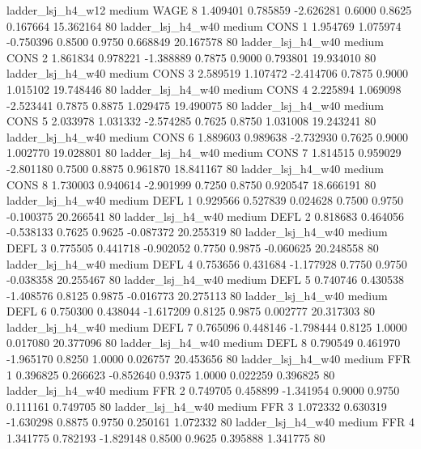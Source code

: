      ladder_lsj_h4_w12     medium     WAGE                 8  1.409401 0.785859 -2.626281 0.6000 0.8625  0.167664   15.362164 80
     ladder_lsj_h4_w40     medium     CONS                 1  1.954769 1.075974 -0.750396 0.8500 0.9750  0.668849   20.167578 80
     ladder_lsj_h4_w40     medium     CONS                 2  1.861834 0.978221 -1.388889 0.7875 0.9000  0.793801   19.934010 80
     ladder_lsj_h4_w40     medium     CONS                 3  2.589519 1.107472 -2.414706 0.7875 0.9000  1.015102   19.748446 80
     ladder_lsj_h4_w40     medium     CONS                 4  2.225894 1.069098 -2.523441 0.7875 0.8875  1.029475   19.490075 80
     ladder_lsj_h4_w40     medium     CONS                 5  2.033978 1.031332 -2.574285 0.7625 0.8750  1.031008   19.243241 80
     ladder_lsj_h4_w40     medium     CONS                 6  1.889603 0.989638 -2.732930 0.7625 0.9000  1.002770   19.028801 80
     ladder_lsj_h4_w40     medium     CONS                 7  1.814515 0.959029 -2.801180 0.7500 0.8875  0.961870   18.841167 80
     ladder_lsj_h4_w40     medium     CONS                 8  1.730003 0.940614 -2.901999 0.7250 0.8750  0.920547   18.666191 80
     ladder_lsj_h4_w40     medium     DEFL                 1  0.929566 0.527839  0.024628 0.7500 0.9750 -0.100375   20.266541 80
     ladder_lsj_h4_w40     medium     DEFL                 2  0.818683 0.464056 -0.538133 0.7625 0.9625 -0.087372   20.255319 80
     ladder_lsj_h4_w40     medium     DEFL                 3  0.775505 0.441718 -0.902052 0.7750 0.9875 -0.060625   20.248558 80
     ladder_lsj_h4_w40     medium     DEFL                 4  0.753656 0.431684 -1.177928 0.7750 0.9750 -0.038358   20.255467 80
     ladder_lsj_h4_w40     medium     DEFL                 5  0.740746 0.430538 -1.408576 0.8125 0.9875 -0.016773   20.275113 80
     ladder_lsj_h4_w40     medium     DEFL                 6  0.750300 0.438044 -1.617209 0.8125 0.9875  0.002777   20.317303 80
     ladder_lsj_h4_w40     medium     DEFL                 7  0.765096 0.448146 -1.798444 0.8125 1.0000  0.017080   20.377096 80
     ladder_lsj_h4_w40     medium     DEFL                 8  0.790549 0.461970 -1.965170 0.8250 1.0000  0.026757   20.453656 80
     ladder_lsj_h4_w40     medium      FFR                 1  0.396825 0.266623 -0.852640 0.9375 1.0000  0.022259    0.396825 80
     ladder_lsj_h4_w40     medium      FFR                 2  0.749705 0.458899 -1.341954 0.9000 0.9750  0.111161    0.749705 80
     ladder_lsj_h4_w40     medium      FFR                 3  1.072332 0.630319 -1.630298 0.8875 0.9750  0.250161    1.072332 80
     ladder_lsj_h4_w40     medium      FFR                 4  1.341775 0.782193 -1.829148 0.8500 0.9625  0.395888    1.341775 80
